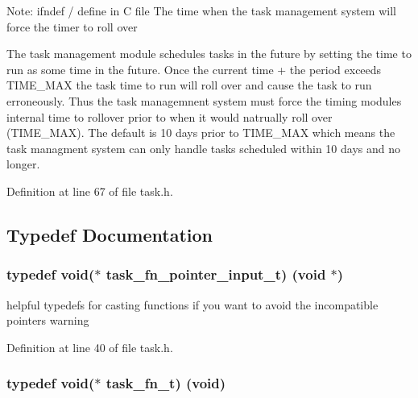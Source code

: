 Note\+: ifndef / define in C file The time when the task management system will force the timer to roll over

The task management module schedules tasks in the future by setting the time to run as some time in the future. Once the current time + the period exceeds T\+I\+M\+E\+\_\+\+M\+A\+X the task time to run will roll over and cause the task to run erroneously. Thus the task managemnent system must force the timing module\textquotesingle{}s internal time to rollover prior to when it would natrually roll over (T\+I\+M\+E\+\_\+\+M\+A\+X). The default is 10 days prior to T\+I\+M\+E\+\_\+\+M\+A\+X which means the task managment system can only handle tasks scheduled within 10 days and no longer. 

Definition at line 67 of file task.\+h.



\subsection{Typedef Documentation}
\hypertarget{group__task_ga08219bddd9fe09eb5192564ad47dad99}{}
\subsubsection[{task\+\_\+fn\+\_\+pointer\+\_\+input\+\_\+t}]{\setlength{\rightskip}{0pt plus 5cm}typedef void($\ast$ task\+\_\+fn\+\_\+pointer\+\_\+input\+\_\+t) (void $\ast$)}\label{group__task_ga08219bddd9fe09eb5192564ad47dad99}
helpful typedef\textquotesingle{}s for casting functions if you want to avoid the incompatible pointers warning 

Definition at line 40 of file task.\+h.

\hypertarget{group__task_ga318336c763a22ea5f1c49c52ac5b6fe2}{}
\subsubsection[{task\+\_\+fn\+\_\+t}]{\setlength{\rightskip}{0pt plus 5cm}typedef void($\ast$ task\+\_\+fn\+\_\+t) (void)}\label{group__task_ga318336c763a22ea5f1c49c52ac5b6fe2}


